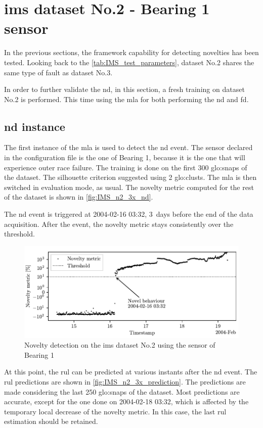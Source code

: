 \section{\gls{ims} dataset No.2 - Bearing 1 sensor}
\label{sec:IMS_n2_3x}

In the previous sections, the framework capability for detecting novelties has been tested. Looking back to the \autoref{tab:IMS_test_parameters}, dataset No.2 shares the same type of fault as dataset No.3.

In order to further validate the \gls{nd}, in this section, a fresh training on dataset No.2 is performed. This time using the \gls{mla} for both performing the \gls{nd} and \gls{fd}.

\subsection{\gls{nd} instance}
The first instance of the \gls{mla} is used to detect the \gls{nd} event. The sensor declared in the configuration file is the one of Bearing 1, because it is the one that will experience outer race failure. The training is done on the first 300 \gls{glo:snap}s of the dataset. The silhouette criterion suggested using 2 \gls{glo:clust}s. The \gls{mla} is then switched in evaluation mode, as usual. The novelty metric computed for the rest of the dataset is shown in \autoref{fig:IMS_n2_3x_nd}. 

The \gls{nd} event is triggered at 2004-02-16 03:32, 3~days before the end of the data acquisition. After the event, the novelty metric stays consistently over the threshold. 

\begin{figure}
    \centering
    \includegraphics{images/IMS/Test02/ND.pdf}
    \caption{Novelty detection on the \gls{ims} dataset No.2 using the sensor of Bearing 1}
    \label{fig:IMS_n2_3x_nd}
\end{figure}

At this point, the \gls{rul} can be predicted at various instants after the \gls{nd} event. The \gls{rul} predictions are shown in \autoref{fig:IMS_n2_3x_prediction}. The predictions are made considering the last 250 \gls{glo:snap}s of the dataset. Most predictions are accurate, except for the one done on 2004-02-18 03:32, which is affected by the temporary local decrease of the novelty metric. In this case, the last \gls{rul} estimation should be retained.

